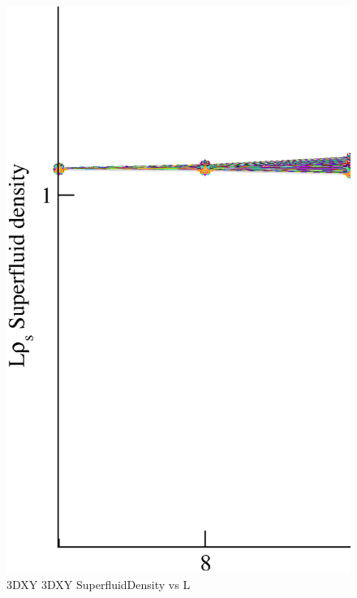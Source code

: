 \begin{figure}[!htpb]
  \centering
  \includegraphics[width=\textwidth]{./plots/3DXY/3DXY_SuperfluidDensity_vs_L.eps}
  \caption{3DXY 3DXY SuperfluidDensity vs L}
\end{figure}

